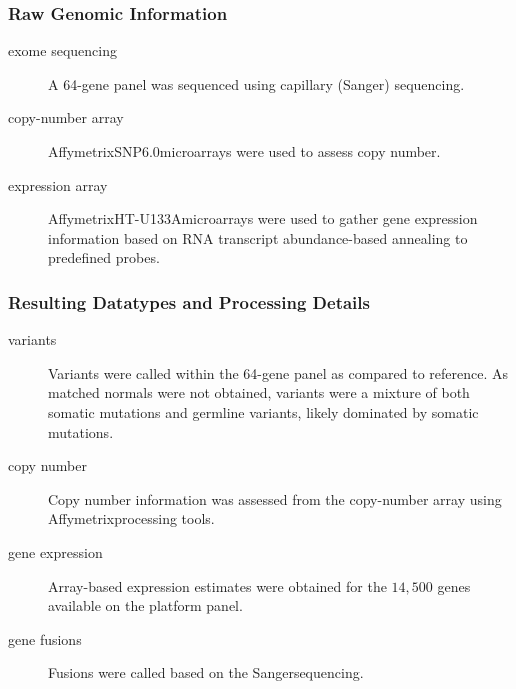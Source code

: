 \subsubsection{Raw Genomic Information}

\begin{description}
\item[exome sequencing]
  A 64-gene panel was sequenced using capillary (Sanger\reg)
  sequencing.

  
\item[copy-number array]
  Affymetrix\reg SNP6.0\tm microarrays were used to assess copy
  number. 

  
\item[expression array]
  Affymetrix\reg HT-U133A\reg microarrays were used to gather gene
  expression information based on RNA transcript abundance-based
  annealing to predefined probes.  
\end{description}


\subsubsection{Resulting Datatypes and Processing Details}

\begin{description}
\item[variants]
  Variants were called within
  the 64-gene panel as compared to reference. As matched normals were
  not obtained, variants were a mixture of both somatic mutations and
  germline variants, likely dominated by somatic mutations.
\item[copy number]
  Copy number information was assessed from the copy-number array
  using Affymetrix\reg processing tools.

  
\item[gene expression]
  Array-based expression estimates were obtained for the $14,500$
  genes available on the platform panel.

  
\item[gene fusions]
  Fusions were called based on the Sanger\reg sequencing. 

\end{description}










